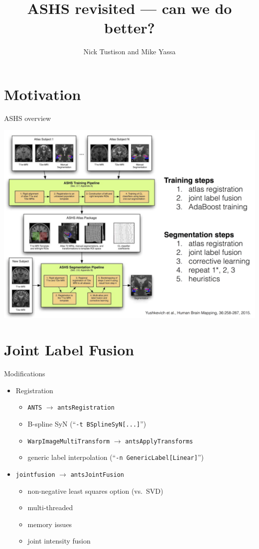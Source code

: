 \documentclass[ignorenonframetext,]{beamer}
\institute{UCI}
\title{ASHS revisited --- can we do better?}
\author{Nick Tustison and Mike Yassa}
\date{}
\providecommand{\tightlist}{%
  \setlength{\itemsep}{0pt}\setlength{\parskip}{0pt}}
\begin{document}
\frame{\titlepage}

\section{Motivation}\label{motivation}

\begin{frame}{ASHS overview}

\centering
\includegraphics[width=0.85 \textwidth]{../Figures/ashs.png}

\end{frame}

\section{Joint Label Fusion}\label{joint-label-fusion}

\begin{frame}[fragile]{Modifications}

\begin{itemize}
\tightlist
\item
  Registration

  \begin{itemize}
  \tightlist
  \item
    \texttt{ANTS} \(\rightarrow\) \texttt{antsRegistration}
  \item
    B-spline SyN (``\texttt{-t\ BSplineSyN{[}...{]}}'')
  \item
    \texttt{WarpImageMultiTransform} \(\rightarrow\)
    \texttt{antsApplyTransforms}
  \item
    generic label interpolation
    (``\texttt{-n\ GenericLabel{[}Linear{]}}'')
  \end{itemize}
\item
  \texttt{jointfusion} \(\rightarrow\) \texttt{antsJointFusion}

  \begin{itemize}
  \tightlist
  \item
    non-negative least squares option (vs.~SVD)
  \item
    multi-threaded
  \item
    memory issues
  \item
    joint intensity fusion
  \end{itemize}
\end{itemize}

\end{frame}
\end{document}
